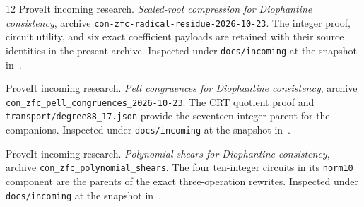 \documentclass[11pt]{article}
\theoremstyle{definition}
\theoremstyle{remark}
\newcommand{\code}[1]{\nolinkurl{#1}}
\begin{document}
\begin{thebibliography}{12}
ProveIt incoming research.
\emph{Scaled-root compression for Diophantine consistency},
archive \code{con-zfc-radical-residue-2026-10-23}.
The integer proof, circuit utility, and six exact coefficient payloads
are retained with their source identities in the present archive.
Inspected under \code{docs/incoming} at the snapshot in~\cite{repo}.

ProveIt incoming research.
\emph{Pell congruences for Diophantine consistency},
archive \code{con_zfc_pell_congruences_2026-10-23}.
The CRT quotient proof and \code{transport/degree88_17.json} provide the
seventeen-integer parent for the companions.
Inspected under \code{docs/incoming} at the snapshot in~\cite{repo}.

ProveIt incoming research.
\emph{Polynomial shears for Diophantine consistency},
archive \code{con_zfc_polynomial_shears}.
The four ten-integer circuits in its \code{norm10} component are the
parents of the exact three-operation rewrites.
Inspected under \code{docs/incoming} at the snapshot in~\cite{repo}.

\end{thebibliography}
\end{document}
